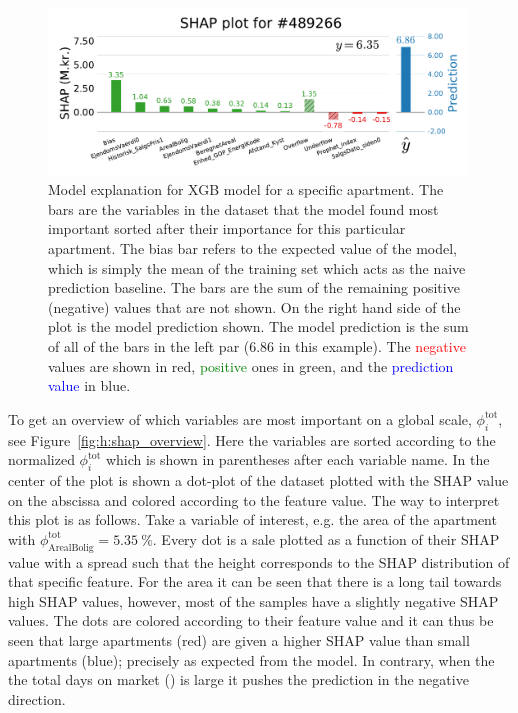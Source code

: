 \begin{figure}[ht!]
  \centerfloat
  \includegraphics[width=0.99\textwidth, trim=15 15 10 40, clip]{figures/housing/Ejerlejlighed_v19_cut_all_Ncols_all_SHAP_fig_loc=489266.pdf}
  \caption[SHAP Prediction Explanation for Apartments]
          {Model explanation for XGB model for a specific apartment. The bars are the variables in the dataset that the model found most important sorted after their importance for this particular apartment. The bias bar refers to the expected value of the model, which is simply the mean of the training set which acts as the naive prediction baseline. The  bars are the sum of the remaining positive (negative) values that are not shown. On the right hand side of the plot is the model prediction shown. The model prediction is the sum of all of the bars in the left par (\SI{6.86}{\Mkr} in this example). The \textcolor{red}{negative} values are shown in red, \textcolor{green}{positive} ones in green, and the \textcolor{blue}{prediction value} in blue. 
          } 
  \label{fig:h:shap_single_apartment}
\end{figure}

To get an overview of which variables are most important on a global scale, $\phi_i^\mathrm{tot}$, see Figure~\ref{fig:h:shap_overview}. Here the variables are sorted according to the normalized $\phi_i^\mathrm{tot}$ which is shown in parentheses after each variable name. In the center of the plot is shown a dot-plot of the dataset plotted with the SHAP value on the abscissa and colored according to the feature value. 
The way to interpret this plot is as follows. Take a variable of interest, e.g. the area of the apartment  with $\phi_\mathrm{ArealBolig}^\mathrm{tot}=\SI{5.35}{\percent}$. Every dot is a sale plotted as a function of their SHAP value with a spread such that the height corresponds to the SHAP distribution of that specific feature. For the area it can be seen that there is a long tail towards high SHAP values, however, most of the samples have a slightly negative SHAP values. The dots are colored according to their feature value and it can thus be seen that large apartments (red) are given a higher SHAP value than small apartments (blue); precisely as expected from the model. In contrary, when the the total days on market () is large it pushes the prediction in the negative direction. 

